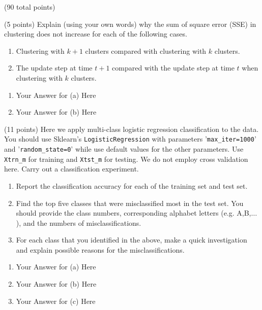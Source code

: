 \documentclass[12pt]{article}
\begin{document}
\begin{question}{(90 total points) \qTwoTitle}
\begin{subquestion}{(5 points)
    Explain (using your own words) why the sum of square error (SSE) in \kmeans clustering does not increase for each of the following cases.
  }
  \begin{enumerate}\NARROWITEM
  \item Clustering with $k+1$ clusters compared with clustering with $k$ clusters.
  \item The update step at time $t+1$ compared with the update step at time $t$ when clustering with $k$ clusters.
  \end{enumerate}
   

  \begin{answerbox}{0.55\textheight}
    \begin{enumerate}
    \item Your Answer for (a) Here
    \item Your Answer for (b) Here
    \end{enumerate}
  \end{answerbox}
  


\end{subquestion}

\begin{subquestion}{(11 points)
    Here we apply multi-class logistic regression classification to the data. You should use Sklearn's {\tt LogisticRegression} with parameters '{\tt max\_iter=1000}' and '{\tt random\_state=0}' while use default values for the other parameters.
    Use {\tt Xtrn\_m} for training and {\tt Xtst\_m} for testing. We do not employ cross validation here.
    Carry out a classification experiment.
  }\label{q2:LR}
  \begin{enumerate}\NARROWITEM
  \item Report the classification accuracy for each of the training set and test set. 
  \item Find the top five classes that were misclassified most in the test set. You should provide the class numbers, corresponding alphabet letters (e.g. A,B,$\ldots$), and the numbers of misclassifications.
  \item For each class that you identified in the above, make a quick investigation and explain possible reasons for the misclassifications.
  \end{enumerate}
   

  \begin{answerbox}{0.7\textheight}
    \begin{enumerate}
    \item Your Answer for (a) Here
    \item Your Answer for (b) Here
    \item Your Answer for (c) Here
    \end{enumerate}
  \end{answerbox}
  



\end{subquestion}
\end{question}
\end{document}
